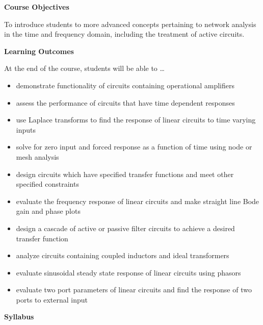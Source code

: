 \textbf{Course Objectives}

To introduce students to more advanced concepts pertaining to network
analysis in the time and frequency domain, including the treatment of
active circuits.

\textbf{Learning Outcomes}

At the end of the course, students will be able to \ldots{}

\begin{itemize}
\item
  demonstrate functionality of circuits containing operational
  amplifiers
\item
  assess the performance of circuits that have time dependent responses
\item
  use Laplace transforms to find the response of linear circuits to time
  varying inputs
\item
  solve for zero input and forced response as a function of time using
  node or mesh analysis
\item
  design circuits which have specified transfer functions and meet other
  specified constraints
\item
  evaluate the frequency response of linear circuits and make straight
  line Bode gain and phase plots
\item
  design a cascade of active or passive filter circuits to achieve a
  desired transfer function
\item
  analyze circuits containing coupled inductors and ideal transformers
\item
  evaluate sinusoidal steady state response of linear circuits using
  phasors
\item
  evaluate two port parameters of linear circuits and find the response
  of two ports to external input
\end{itemize}

\textbf{Syllabus}

